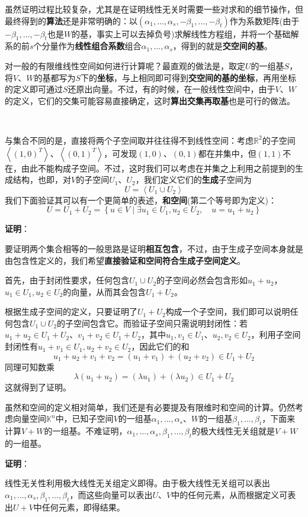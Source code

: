 \documentclass[a4paper,UTF8,fontset=windows,AutoFakeBold]{ctexart}
\newcommand{\proo}[1]{{\vspace{5pt}\kaishu\noindent\textbf{证明}：\vspace{-3pt}
\begin{compactitem}
    \item[] #1
\end{compactitem}
}}
\begin{document}
虽然证明过程比较复杂，尤其是在证明线性无关时需要一些对求和的细节操作，但最终得到的\textbf{算法}还是非常明确的：以$(\alpha_1,\dots,\alpha_s,-\beta_1,\dots,-\beta_t)$作为系数矩阵(由于$-\beta_1,\dots,-\beta_t$也是$W$的基，事实上可以去掉负号)求解线性方程组，并将一个基础解系的前$s$个分量作为\textbf{线性组合系数}组合$\alpha_1,\dots,\alpha_s$，得到的就是\textbf{交空间的基}。

对一般的有限维线性空间如何进行计算呢？最直观的做法是，取定$U$的一组基$S$，将$V$、$W$的基都写为$S$下的\textbf{坐标}，与上相同即可得到\textbf{交空间的基的坐标}，再用坐标的定义即可通过$S$还原出向量。不过，有的时候，在一般线性空间中，由于$V$、$W$的定义，它们的交集可能容易直接确定，这时\textbf{算出交集再取基}也是可行的做法。

\

与集合不同的是，直接将两个子空间取并往往得不到线性空间：考虑$\mathbb{R}^2$的子空间$\left<(1,0)^T\right>$、$\left<(0,1)^T\right>$，可发现$(1,0)$、$(0,1)$都在并集中，但$(1,1)$不在，由此不能构成子空间。不过，这时我们可以考虑在并集之上利用之前提到的生成结构，也即，对$V$的子空间$U_1$、$U_2$，我们定义它们的\textbf{生成}子空间为
$$U=\left<U_1\cup U_2\right>$$
我们下面验证其可以有一个更简单的表述，\textbf{和空间}(第二个等号即为定义)：
$$U=U_1+U_2=\left\{u\in V\mid\exists u_1\in U_1,u_2\in U_2,\quad u=u_1+u_2\right\}$$

\proo{
    要证明两个集合相等的一般思路是证明\textbf{相互包含}，不过，由于生成子空间本身就是由包含性定义的，我们希望\textbf{直接验证和空间符合生成子空间定义}。

    首先，由于封闭性要求，任何包含$U_1\cup U_2$的子空间必然会包含形如$u_1+u_2$，$u_1\in U_1,u_2\in U_2$的向量，从而其会包含$U_1+U_2$。

    根据生成子空间的定义，只要证明了$U_1+U_2$构成一个子空间，我们即可以说明任何包含$U_1\cup U_2$的子空间包含它。而验证子空间只需说明封闭性：若$u_1+u_2\in U_1+U_2$、$v_1+v_2\in U_1+U_2$，其中$u_1,v_1\in U_1$、$u_2,v_2\in U_2$，利用子空间封闭性有$u_1+v_1\in U_1,u_2+v_2\in U_2$，因此它们的和
    $$u_1+u_2+v_1+v_2=(u_1+v_1)+(u_2+v_2)\in U_1+U_2$$
    同理可知数乘
    $$\lambda(u_1+u_2)=(\lambda u_1)+(\lambda u_2)\in U_1+U_2$$
    这就得到了证明。
}

虽然和空间的定义相对简单，我们还是有必要提及有限维时和空间的计算。仍然考虑向量空间$\mathbb{K}^n$中，已知子空间$V$的一组基$\alpha_1,\dots,\alpha_s$、$W$的一组基$\beta_1,\dots,\beta_t$，下面来计算$V+W$的一组基。不难证明，$\alpha_1,\dots,\alpha_s,\beta_1,\dots,\beta_t$的极大线性无关组就是$V+W$的一组基。

\proo{
    线性无关性利用极大线性无关组定义即得。由于极大线性无关组可以表出$\alpha_1,\dots,\alpha_s,\beta_1,\dots,\beta_t$，而这些向量可以表出$U$、$V$中的任何元素，从而根据定义可表出$U+V$中任何元素，即得结果。
}
\end{document}
